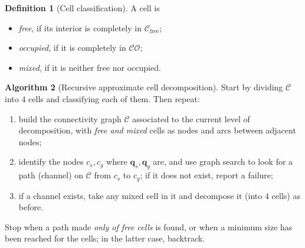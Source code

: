\documentclass[11pt,a4paper]{article}
\newcommand{\Cspace}{\mathcal{C}}
\newcommand{\Cfree}{\mathcal{C}_{\mathrm{free}}}
\newcommand{\CO}{\mathcal{CO}}
\newcommand{\qs}{\boldsymbol{q}_s}
\newcommand{\qg}{\boldsymbol{q}_g}
\theoremstyle{definition}
\newtheorem{definition}{Definition}[section]
\newtheorem{algorithm}[definition]{Algorithm}
\theoremstyle{plain}
\theoremstyle{remark}
\begin{document}
\begin{definition}[Cell classification]
A cell is
\begin{itemize}
  \item \emph{free}, if its interior is completely in $\Cfree$;
  \item \emph{occupied}, if it is completely in $\CO$;
  \item \emph{mixed}, if it is neither free nor occupied.
\end{itemize}
\end{definition}

\begin{algorithm}[Recursive approximate cell decomposition]
\label{alg:approx}
Start by dividing $\Cspace$ into $4$ cells and classifying each of them. Then repeat:
\begin{enumerate}
  \item build the connectivity graph $\mathcal{C}$ associated to the current level of decomposition, with \emph{free and mixed} cells as nodes and arcs between adjacent nodes;
  \item identify the nodes $c_s,c_g$ where $\qs,\qg$ are, and use graph search to look for a path (channel) on $\mathcal{C}$ from $c_s$ to $c_g$; if it does not exist, report a failure;
  \item if a channel exists, take any mixed cell in it and decompose it (into $4$ cells) as before.
\end{enumerate}
Stop when a path made \emph{only of free cells} is found, or when a minimum size has been reached for the cells; in the latter case, backtrack.
\end{algorithm}
\end{document}
